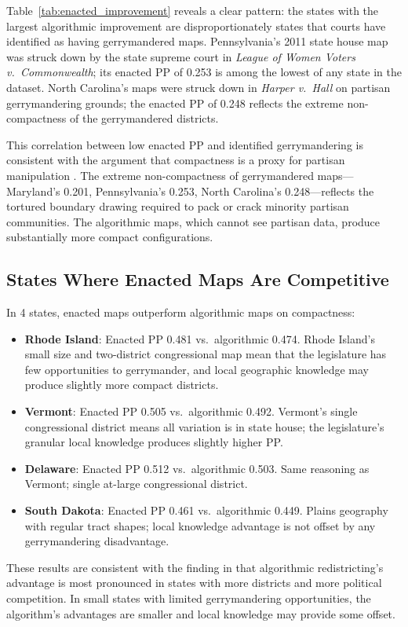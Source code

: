\noindent Table~\ref{tab:enacted_improvement} reveals a clear pattern: the states with the largest algorithmic improvement are disproportionately states that courts have identified as having gerrymandered maps. Pennsylvania's 2011 state house map was struck down by the state supreme court in \textit{League of Women Voters v.\ Commonwealth}; its enacted PP of 0.253 is among the lowest of any state in the dataset. North Carolina's maps were struck down in \textit{Harper v.\ Hall} on partisan gerrymandering grounds; the enacted PP of 0.248 reflects the extreme non-compactness of the gerrymandered districts.

This correlation between low enacted PP and identified gerrymandering is consistent with the argument that compactness is a proxy for partisan manipulation \citep{polsby1991third}. The extreme non-compactness of gerrymandered maps---Maryland's 0.201, Pennsylvania's 0.253, North Carolina's 0.248---reflects the tortured boundary drawing required to pack or crack minority partisan communities. The algorithmic maps, which cannot see partisan data, produce substantially more compact configurations.

\subsection{States Where Enacted Maps Are Competitive}

In 4 states, enacted maps outperform algorithmic maps on compactness:

\begin{itemize}
\item \textbf{Rhode Island}: Enacted PP 0.481 vs.\ algorithmic 0.474. Rhode Island's small size and two-district congressional map mean that the legislature has few opportunities to gerrymander, and local geographic knowledge may produce slightly more compact districts.
\item \textbf{Vermont}: Enacted PP 0.505 vs.\ algorithmic 0.492. Vermont's single congressional district means all variation is in state house; the legislature's granular local knowledge produces slightly higher PP.
\item \textbf{Delaware}: Enacted PP 0.512 vs.\ algorithmic 0.503. Same reasoning as Vermont; single at-large congressional district.
\item \textbf{South Dakota}: Enacted PP 0.461 vs.\ algorithmic 0.449. Plains geography with regular tract shapes; local knowledge advantage is not offset by any gerrymandering disadvantage.
\end{itemize}

These results are consistent with the finding in \citet{altman2011promise} that algorithmic redistricting's advantage is most pronounced in states with more districts and more political competition. In small states with limited gerrymandering opportunities, the algorithm's advantages are smaller and local knowledge may provide some offset.
